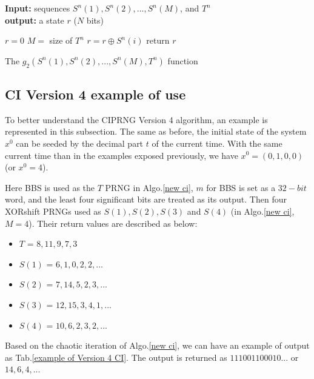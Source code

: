 \begin{algorithm}
\textbf{Input:} sequences $S^n(1), S^n(2), ..., S^n(M)$, and $T^n$\\
\textbf{output:} a state $r$ ($N$ bits)\\
\begin{algorithmic}[1]
\STATE$r = 0 $\;
\STATE$M =$ size of $T^n$ \;
\;
{
\STATE $r = r \oplus S^n(i)$\;
}\ENDIF
\ENDFOR
\STATE return $r$\;
\medskip
\caption{The $g_2(S^n(1),S^n(2),...,S^n(M),T^n)$ function}
\label{g_2}
\end{algorithmic}
\end{algorithm}

\subsection{CI Version 4 example of use}
To better understand the CIPRNG Version 4 algorithm, an example is represented in this subsection. The same as before, the initial state of the system $x^0$ can be seeded by the decimal part $t$ of the current time. With the same current time than in the examples exposed previously, we have $x^0 = (0,1,0,0)$ (or $x^0 = 4$). 

Here BBS is used as the $T$ PRNG in Algo.\ref{new ci}, $m$ for BBS is set as a $32-bit$ word, and the least four significant bits are treated as its output. Then four XORshift PRNGs used as $S(1),S(2),S(3)$ and $S(4)$ (in Algo.\ref{new ci}, $M = 4$). Their return values are described as below:
\begin{itemize}
\item $T$ = $8,11,9,7,3$
\item $S(1)$ = $6,1,0,2,2, . . .$
\item $S(2)$ = $7,14,5,2,3, . . .$
\item $S(3)$ = $12,15,3,4,1, . . .$
\item $S(4)$ = $10,6,2,3,2, . . .$
\end{itemize}

Based on the chaotic iteration of Algo.\ref{new ci}, we can have an example of output as Tab.\ref{example of Version 4 CI}. The output is returned as $111001100010...$ or $14,6,4,...$

